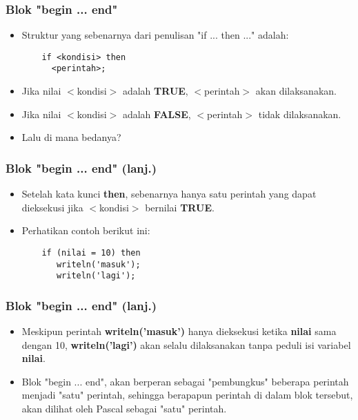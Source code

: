 \begin{frame}[fragile]
\frametitle{Blok "begin ... end"}
\begin{itemize}
  \item Struktur yang sebenarnya dari penulisan "if ... then ..." adalah:
  \begin{lstlisting}
    if <kondisi> then
      <perintah>;
  \end{lstlisting}
  \item Jika nilai $<$kondisi$>$ adalah \textbf{TRUE}, $<$perintah$>$ akan dilaksanakan.
  \item Jika nilai $<$kondisi$>$ adalah \textbf{FALSE}, $<$perintah$>$ tidak dilaksanakan.
  \item Lalu di mana bedanya?
\end{itemize}
\end{frame}

\begin{frame}[fragile]
\frametitle{Blok "begin ... end" (lanj.)}
\begin{itemize}
  \item Setelah kata kunci \textbf{then}, sebenarnya hanya \alert{satu} perintah yang dapat dieksekusi jika $<$kondisi$>$ bernilai \textbf{TRUE}.
  \item Perhatikan contoh berikut ini:
  \begin{lstlisting}
    if (nilai = 10) then
       writeln('masuk');
       writeln('lagi');
  \end{lstlisting}
\end{itemize}
\end{frame}

\begin{frame}[fragile]
\frametitle{Blok "begin ... end" (lanj.)}
\begin{itemize}
  \item Meskipun perintah \textbf{writeln('masuk')} hanya dieksekusi ketika \textbf{nilai} sama dengan 10, \textbf{writeln('lagi')} akan \alert{selalu dilaksanakan} tanpa peduli isi variabel \textbf{nilai}.
  \item Blok "begin ... end", akan berperan sebagai "pembungkus" beberapa perintah menjadi "satu" perintah, sehingga berapapun perintah di dalam blok tersebut, akan dilihat oleh Pascal sebagai "satu" perintah.
\end{itemize}
\end{frame}

